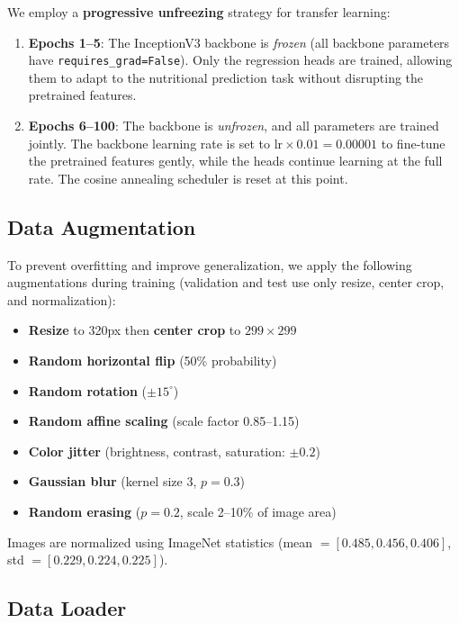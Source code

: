 \documentclass[11pt,a4paper]{article}
\begin{document}
We employ a \textbf{progressive unfreezing} strategy for transfer learning:
\begin{enumerate}
  \item \textbf{Epochs 1--5}: The InceptionV3 backbone is \emph{frozen} (all backbone parameters have \texttt{requires\_grad=False}). Only the regression heads are trained, allowing them to adapt to the nutritional prediction task without disrupting the pretrained features.
  \item \textbf{Epochs 6--100}: The backbone is \emph{unfrozen}, and all parameters are trained jointly. The backbone learning rate is set to $\text{lr} \times 0.01 = 0.00001$ to fine-tune the pretrained features gently, while the heads continue learning at the full rate. The cosine annealing scheduler is reset at this point.
\end{enumerate}

\subsection{Data Augmentation}

To prevent overfitting and improve generalization, we apply the following augmentations during training (validation and test use only resize, center crop, and normalization):
\begin{itemize}
  \item \textbf{Resize} to 320px then \textbf{center crop} to $299 \times 299$
  \item \textbf{Random horizontal flip} (50\% probability)
  \item \textbf{Random rotation} ($\pm 15^{\circ}$)
  \item \textbf{Random affine scaling} (scale factor 0.85--1.15)
  \item \textbf{Color jitter} (brightness, contrast, saturation: $\pm 0.2$)
  \item \textbf{Gaussian blur} (kernel size 3, $p = 0.3$)
  \item \textbf{Random erasing} ($p = 0.2$, scale 2--10\% of image area)
\end{itemize}

Images are normalized using ImageNet statistics (mean $= [0.485, 0.456, 0.406]$, std $= [0.229, 0.224, 0.225]$).

\subsection{Data Loader}
\end{document}
